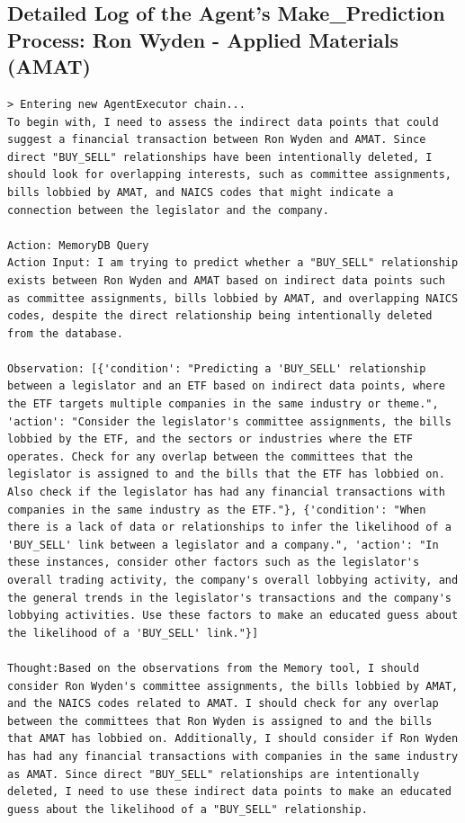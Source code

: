 \documentclass[15pt,letterpaper]{article}
\begin{document}
\subsection*{Detailed Log of the Agent's Make\_Prediction Process: Ron Wyden - Applied Materials (AMAT)}\label{app:log:make_prediction}

\begin{Verbatim}[breaklines=true, frame=single]
> Entering new AgentExecutor chain...
To begin with, I need to assess the indirect data points that could suggest a financial transaction between Ron Wyden and AMAT. Since direct "BUY_SELL" relationships have been intentionally deleted, I should look for overlapping interests, such as committee assignments, bills lobbied by AMAT, and NAICS codes that might indicate a connection between the legislator and the company.  
  
Action: MemoryDB Query
Action Input: I am trying to predict whether a "BUY_SELL" relationship exists between Ron Wyden and AMAT based on indirect data points such as committee assignments, bills lobbied by AMAT, and overlapping NAICS codes, despite the direct relationship being intentionally deleted from the database.

Observation: [{'condition': "Predicting a 'BUY_SELL' relationship between a legislator and an ETF based on indirect data points, where the ETF targets multiple companies in the same industry or theme.", 'action': "Consider the legislator's committee assignments, the bills lobbied by the ETF, and the sectors or industries where the ETF operates. Check for any overlap between the committees that the legislator is assigned to and the bills that the ETF has lobbied on. Also check if the legislator has had any financial transactions with companies in the same industry as the ETF."}, {'condition': "When there is a lack of data or relationships to infer the likelihood of a 'BUY_SELL' link between a legislator and a company.", 'action': "In these instances, consider other factors such as the legislator's overall trading activity, the company's overall lobbying activity, and the general trends in the legislator's transactions and the company's lobbying activities. Use these factors to make an educated guess about the likelihood of a 'BUY_SELL' link."}]
  
Thought:Based on the observations from the Memory tool, I should consider Ron Wyden's committee assignments, the bills lobbied by AMAT, and the NAICS codes related to AMAT. I should check for any overlap between the committees that Ron Wyden is assigned to and the bills that AMAT has lobbied on. Additionally, I should consider if Ron Wyden has had any financial transactions with companies in the same industry as AMAT. Since direct "BUY_SELL" relationships are intentionally deleted, I need to use these indirect data points to make an educated guess about the likelihood of a "BUY_SELL" relationship.


\end{Verbatim}
\end{document}
